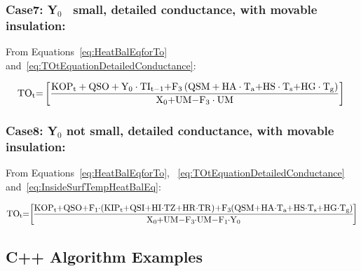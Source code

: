\subsubsection{Case7: Y\(_{0}\)~ small, detailed conductance, with movable insulation:}\label{case7-yux5f0-small-detailed-conductance-with-movable-insulation}

From Equations~\ref{eq:HeatBalEqforTo} and~\ref{eq:TOtEquationDetailedConductance}:

\begin{equation}
{\rm{T}}{{\rm{O}}_{\rm{t}}}{\rm{ = }}\left[ {\frac{{{\rm{KO}}{{\rm{P}}_{\rm{t}}} + {\rm{QSO}} + {{\rm{Y}}_0}\cdot {\rm{T}}{{\rm{I}}_{{\rm{t - 1}}}}{\rm{ + }}{{\rm{F}}_{\rm{3}}}\left( {{\rm{QSM + HA}}\cdot {{\rm{T}}_{\rm{a}}}{\rm{ + HS}}\cdot {{\rm{T}}_{\rm{s}}}{\rm{ + HG}}\cdot {{\rm{T}}_{\rm{g}}}} \right)}}{{{{\rm{X}}_{\rm{0}}}{\rm{ + UM - }}{{\rm{F}}_{\rm{3}}}\cdot {\rm{UM}}}}} \right]{\rm{  }}
\label{eq:HeatBalanceEquationCase7}
\end{equation}

\subsubsection{Case8: Y\(_{0}\) not small, detailed conductance, with movable insulation:}\label{case8-yux5f0-not-small-detailed-conductance-with-movable-insulation}

From Equations~\ref{eq:HeatBalEqforTo}, ~\ref{eq:TOtEquationDetailedConductance} and~\ref{eq:InsideSurfTempHeatBalEq}:

\begin{equation}
\medmuskip=0mu
\thinmuskip=0mu
\thickmuskip=0mu
\nulldelimiterspace=0pt
\scriptspace=0pt
{\rm{T}}{{\rm{O}}_{\rm{t}}}{\rm{ = }}\left[ {\frac{{{\rm{KO}}{{\rm{P}}_{\rm{t}}} + {\rm{QSO}} + {{\rm{F}}_1}\cdot \left( {{\rm{KI}}{{\rm{P}}_{\rm{t}}}{\rm{ + QSI + HI}}\cdot {\rm{TZ + HR}}\cdot {\rm{TR}}} \right){\rm{ + }}{{\rm{F}}_{\rm{3}}}\left( {{\rm{QSM + HA}}\cdot {{\rm{T}}_{\rm{a}}}{\rm{ + HS}}\cdot {{\rm{T}}_{\rm{s}}}{\rm{ + HG}}\cdot {{\rm{T}}_{\rm{g}}}} \right)}}{{{{\rm{X}}_{\rm{0}}}{\rm{ + UM - }}{{\rm{F}}_{\rm{3}}}\cdot {\rm{UM - }}{{\rm{F}}_{\rm{1}}}\cdot {{\rm{Y}}_{\rm{0}}}}}} \right]{\rm{  }}
\label{eq:HeatBalanceEquationCase8}
\end{equation}

\subsection{C++ Algorithm Examples}\label{c++-algorithm-examples}

